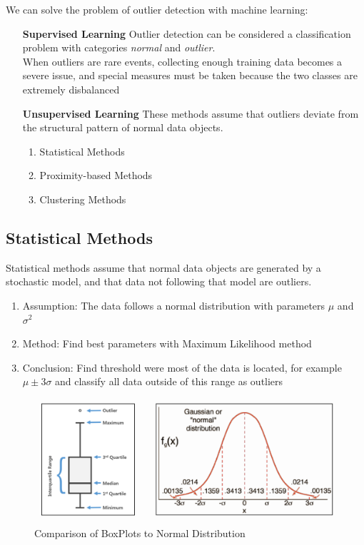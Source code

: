 \documentclass[a4paper, 11pt]{article}
\begin{document}
We can solve the problem of outlier detection with machine learning:

\begin{itemize}[leftmargin=*, labelindent=5cm, labelsep=0.5cm]
    \item[\textbf{Supervised Learning}] Outlier detection can be considered a classification problem with categories \emph{normal} and \emph{outlier}.\\
        When outliers are rare events, collecting enough training data becomes a severe issue, and special measures must be taken because the two classes are extremely disbalanced
    \item[\textbf{Unsupervised Learning}] These methods assume that outliers deviate from the structural pattern of normal data objects.
    \begin{enumerate}
        \item Statistical Methods
        \item Proximity-based Methods
        \item Clustering Methods
    \end{enumerate}
\end{itemize}

\subsection{Statistical Methods}
Statistical methods assume that normal data objects are generated by a stochastic model, and that data not following that model are outliers.

\begin{enumerate}
    \item Assumption: The data follows a normal distribution with parameters $\mu$ and $\sigma^2$
    \item Method: Find best parameters with Maximum Likelihood method
    \item Conclusion: Find threshold were most of the data is located, for example $\mu \pm 3\sigma$ and classify all data outside of this range as outliers
\end{enumerate}

\begin{figure}[tbh!]
    \centering
    \includegraphics[width=0.5\linewidth, keepaspectratio]{Pictures/outlier_boxplot}
    \caption{Comparison of BoxPlots to Normal Distribution}
    \label{fig:outlierboxplot}
\end{figure}
\end{document}
